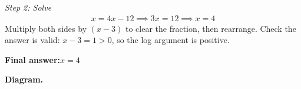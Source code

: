 \documentclass[11pt]{article}
\begin{document}
\textit{Step 2: Solve}
\[\begin{gathered}
x = 4x - 12 \implies 3x = 12 \implies x = 4
\end{gathered}\]
Multiply both sides by \( (x-3) \) to clear the fraction, then rearrange. Check the answer is valid: \( x - 3 = 1 > 0 \), so the log argument is positive.

\begin{answerbox}
\textbf{Final answer:}\quad \(\displaystyle x = 4\)
\end{answerbox}
\textbf{Diagram.}

\begin{center}
\end{center}
\end{document}

